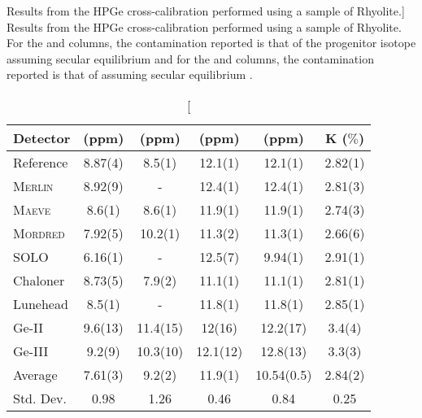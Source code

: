 \begin{table}[t!]
\centering
\vspace{-5mm}
\caption
[Results from the HPGe cross-calibration performed using a sample of Rhyolite.]
{Results from the HPGe cross-calibration performed using a sample of Rhyolite. For the \utTeE{} and \utTeL{} columns, the contamination reported is that of the progenitor isotope \utTe{} assuming secular equilibrium and for the \thtTtE{} and \thtTtL{} columns, the contamination reported is that of \thtTt{} assuming secular equilibrium \cite{lz_screening}.}
    \label{tab:GeCrossCal}
    \renewcommand{\arraystretch}{1.1}
    \begin{tabular}{lccccc}
    \toprule
    
    \textbf{Detector} & %
    \textbf{\utTeE{} (ppm)}  & %
    \textbf{\utTeL{} (ppm)} &  %
    \textbf{\thtTtE{} (ppm)} &  %
    \textbf{\thtTtL{} (ppm)}  & %
    \textbf{K ($\%$)}   \\  %
    
    \hline
    \hline
    
    Reference & 8.87(4) & 8.5(1) & 12.1(1) & 12.1(1) & 2.82(1) \\
    
    \hline
   
    \textsc{Merlin} & 8.92(9) & - & 12.4(1) & 12.4(1) & 2.81(3) \\
    \textsc{Maeve} & 8.6(1) & 8.6(1) & 11.9(1) & 11.9(1) & 2.74(3) \\
    \textsc{Mordred} & 7.92(5) & 10.2(1) & 11.3(2) & 11.3(1) & 2.66(6) \\
    SOLO & 6.16(1) & - & 12.5(7) & 9.94(1) & 2.91(1) \\
    Chaloner & 8.73(5) & 7.9(2) & 11.1(1) & 11.1(1) & 2.81(1) \\
    Lunehead & 8.5(1) & - & 11.8(1) & 11.8(1) & 2.85(1) \\
    Ge-II & 9.6(13) & 11.4(15) & 12(16) & 12.2(17) & 3.4(4) \\
    Ge-III & 9.2(9) & 10.3(10) & 12.1(12) & 12.8(13) & 3.3(3) \\
   
    \hline
   
    Average & 7.61(3) & 9.2(2) & 11.9(1) & 10.54(0.5) & 2.84(2) \\
    Std. Dev. & 0.98 & 1.26 & 0.46 & 0.84 & 0.25 \\
    
    \bottomrule
\end{tabular}
\end{table}